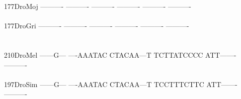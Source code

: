 \documentclass[11pt,twoside,reqno,a4paper]{article}
\begin{document}
{177\hspace*{2\charwidth}DroMoj	----------	----------	----------	----------	----------	----------	\\
\hspace*{5\charwidth}\hspace*{7\charwidth}\hspace*{1\charwidth}\hspace*{1\charwidth}\hspace*{1\charwidth}\hspace*{1\charwidth}\hspace*{1\charwidth}\hspace*{1\charwidth}\\
177\hspace*{2\charwidth}DroGri	----------	----------	----------	----------	----------	----------	\\
\hspace*{5\charwidth}\hspace*{7\charwidth}\hspace*{1\charwidth}\hspace*{1\charwidth}\hspace*{1\charwidth}\hspace*{1\charwidth}\hspace*{1\charwidth}\hspace*{1\charwidth}\\
\\
210\hspace*{2\charwidth}DroMel	------G---	----AAATAC	CTACAA---T	TCTTATCCCC	ATT-------	----------	\\
\hspace*{5\charwidth}\hspace*{7\charwidth}\hspace*{1\charwidth}\hspace*{1\charwidth}\hspace*{1\charwidth}\hspace*{1\charwidth}\hspace*{1\charwidth}\hspace*{1\charwidth}\\
197\hspace*{2\charwidth}DroSim	------G---	----AAATAC	CTACAA---T	TCCTTTCTTC	ATT-------	----------	\\
\hspace*{5\charwidth}\hspace*{7\charwidth}\hspace*{1\charwidth}\hspace*{1\charwidth}\hspace*{1\charwidth}\hspace*{1\charwidth}\hspace*{1\charwidth}\hspace*{1\charwidth}\\
}
\end{document}
